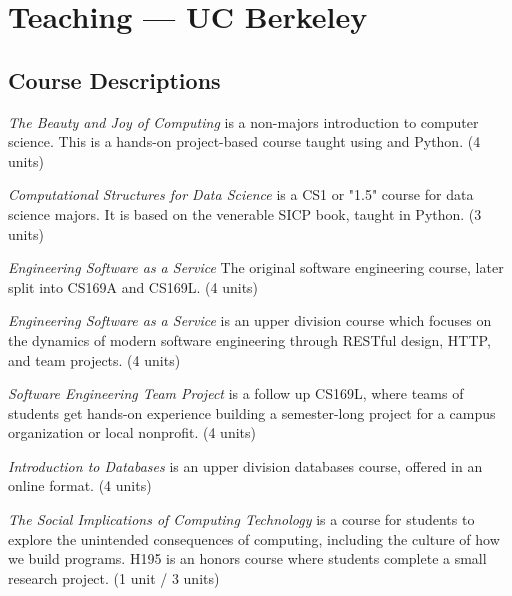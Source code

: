 \section{Teaching — UC Berkeley}

\vspace{6pt}

\subsection{Course Descriptions}

\vspace{5pt}
\begin{description}
    \setlength\itemsep{0.7em}
    \item[CS10] \textit{The Beauty and Joy of Computing} is a non-majors introduction to computer science. This is a hands-on project-based course taught using \snap and Python.  (4 units) %
    \item[CS88 / DATA C88C] \textit{Computational Structures for Data Science} is a CS1 or "1.5" course for data science majors. It is based on the venerable SICP book, taught in Python. (3 units)

    \item[CS169] \textit{Engineering Software as a Service} The original software engineering course, later split into CS169A and CS169L. (4 units)
    
    \item[CS169A] \textit{Engineering Software as a Service} is an upper division course which focuses on the dynamics of modern software engineering through RESTful design, HTTP, and team projects. (4 units)
    
    \item[CS169L] \textit{Software Engineering Team Project} is a follow up CS169L, where teams of students get hands-on experience building a semester-long project for a campus organization or local nonprofit.  (4 units)
    
    \item[CSW186] \textit{Introduction to Databases} is an upper division databases course, offered in an online format.  (4 units)
    \item[CS195 / CSH195] \textit{The Social Implications of Computing Technology} is a course for students to explore the unintended consequences of computing, including the culture of how we build programs. H195 is an honors course where students complete a small research project. (1 unit / 3 units)
    

\end{description}

